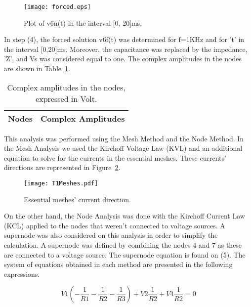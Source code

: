 \begin{figure}[h] \centering
\texttt{[image: forced.eps]}
\caption{Plot of v6n(t) in the interval [0, 20]ms.}
\label{fig:plotA(4)}
\end{figure}

In step (4), the forced solution v6f(t) was determined for f=1KHz and for 't' in the interval [0,20]ms. Moreover, the capacitance was replaced by the impedance, 'Z', and Vs was considered equal to one. The complex amplitudes in the nodes are shown in Table~\ref{tab:anal4}.

\begin{table}[h]
  \centering
  \begin{tabular}{|l|r|}
    \hline    
    {\bf Nodes} & {\bf Complex Amplitudes} \\ \hline
    
  \end{tabular}
  \caption{Complex amplitudes in the nodes, expressed in Volt.}
  \label{tab:anal4}
\end{table}













This analysis was performed using the Mesh Method and the Node Method. 
In the Mesh Analysis we used the Kirchoff Voltage Law (KVL) and an additional equation to solve for the currents in the essential meshes. These currents' directions are represented in Figure~\ref{fig:T1Meshes}.

\vspace{6.0cm}

\begin{figure}[h] \centering
\texttt{[image: T1Meshes.pdf]}
\caption{Essential meshes' current direction.}
\label{fig:T1Meshes}
\end{figure}

On the other hand, the Node Analysis was done with the Kirchoff Current Law (KCL) applied to the nodes that weren't connected to voltage sources. A supernode was also considered on this analysis in order to simplify the calculation. A supernode was defined by combining the nodes 4 and 7 as these are connected to a voltage source. The supernode equation is found on (5).
The system of equations obtained in each method are presented in the following expressions.

\begin{equation}
  V1(-\frac{1}{R1}-\frac{1}{R2}-\frac{1}{R3}) + V2\frac{1}{R2} + V4\frac{1}{R2} = 0
\end{equation}

